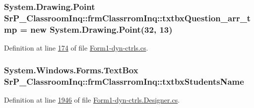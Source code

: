 \hypertarget{class_sr_p___classroom_inq_1_1frm_classrrom_inq_a09f25b6934ed463e8b781498b5511796}{
\subsubsection[{txtbx\-Question\-\_\-arr\-\_\-tmp}]{\setlength{\rightskip}{0pt plus 5cm}\-System.\-Drawing.\-Point {\bf \-Sr\-P\-\_\-\-Classroom\-Inq\-::frm\-Classrrom\-Inq\-::txtbx\-Question\-\_\-arr\-\_\-tmp} = new \-System.\-Drawing.\-Point(32, 13)}}
\label{class_sr_p___classroom_inq_1_1frm_classrrom_inq_a09f25b6934ed463e8b781498b5511796}


\-Definition at line \hyperlink{_form1-dyn-ctrls_8cs_source_l00174}{174} of file \hyperlink{_form1-dyn-ctrls_8cs_source}{\-Form1-\/dyn-\/ctrls.\-cs}.

\hypertarget{class_sr_p___classroom_inq_1_1frm_classrrom_inq_ad797f7d682d2f40b509b4904fac76461}{
\subsubsection[{txtbx\-Students\-Name}]{\setlength{\rightskip}{0pt plus 5cm}\-System.\-Windows.\-Forms.\-Text\-Box {\bf \-Sr\-P\-\_\-\-Classroom\-Inq\-::frm\-Classrrom\-Inq\-::txtbx\-Students\-Name}}}
\label{class_sr_p___classroom_inq_1_1frm_classrrom_inq_ad797f7d682d2f40b509b4904fac76461}


\-Definition at line \hyperlink{_form1-dyn-ctrls_8_designer_8cs_source_l01946}{1946} of file \hyperlink{_form1-dyn-ctrls_8_designer_8cs_source}{\-Form1-\/dyn-\/ctrls.\-Designer.\-cs}.

